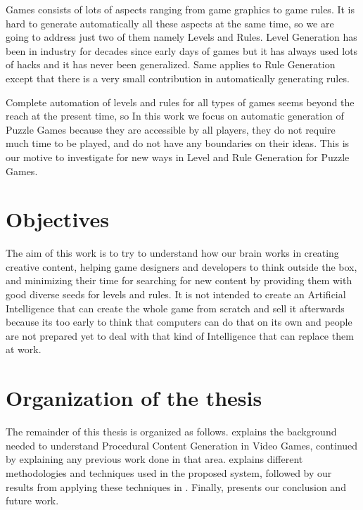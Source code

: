Games consists of lots of aspects ranging from game graphics to game rules. It is hard to generate automatically all these aspects at the same time, so we are going to address just two of them namely Levels and Rules. Level Generation has been in industry for decades since early days of games \cite{pcgFirstGame} but it has always used lots of hacks and it has never been generalized. Same applies to Rule Generation except that there is a very small contribution in automatically generating rules.\\\par

Complete automation of levels and rules for all types of games seems beyond the reach at the present time, so In this work we focus on automatic generation of Puzzle Games because they are accessible by all players, they do not require much time to be played, and do not have any boundaries on their ideas. This is our motive to investigate for new ways in Level and Rule Generation for Puzzle Games.

\section{Objectives}
The aim of this work is to try to understand how our brain works in creating creative content, helping game designers and developers to think outside the box, and minimizing their time for searching for new content by providing them with good diverse seeds for levels and rules. It is not intended to create an Artificial Intelligence that can create the whole game from scratch and sell it afterwards because its too early to think that computers can do that on its own and people are not prepared yet to deal with that kind of Intelligence that can replace them at work.


\section{Organization of the thesis}
The remainder of this thesis is organized as follows.  explains the background needed to understand Procedural Content Generation in Video Games, continued by  explaining any previous work done in that area.  explains different methodologies and techniques used in the proposed system, followed by our results from applying these techniques in . Finally,  presents our conclusion and future work.